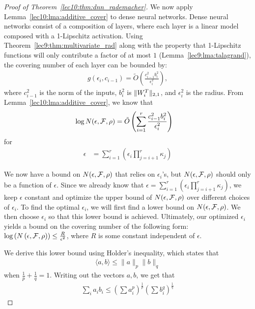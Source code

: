 \begin{proof}[Proof of Theorem~\ref{lec10:thm:dnn_rademacher}]
We now apply Lemma~\ref{lec10:lma:additive_cover} to dense neural networks. Dense neural networks consist of a composition of layers, where each layer is a linear model composed with a 1-Lipschitz activation. Using Theorem~\ref{lec9:thm:multivariate_rad} along with the property that 1-Lipschitz functions will only contribute a factor of at most $1$ (Lemma~\ref{lec9:lma:talagrand}), the covering number of each layer can be bounded by:
\begin{align}
    g\left(\epsilon_i, c_{i-1}\right) = \tilde{O}\left(\frac{c_{i-1}^2b_i^2}{\epsilon_i^2}\right),
\end{align}
where $c_{i-1}^2$ is the norm of the inputs, $b_i^2$ is $\|W_i^T\|_{2,1}$, and $\epsilon_i^2$ is the radius. From Lemma~\ref{lec10:lma:additive_cover}, we know that 
\begin{align}
    \log N(\epsilon, \mathcal F, \rho) &= \tilde{O}\left(\sum_{i=1}^{r}\frac{c_{i-1}^2b_i^2}{\epsilon_i^2}\right) 
\end{align}
for
\begin{align}
    \epsilon &= \sum_{i=1}^{r} \left(\epsilon_i \prod_{j=i+1}^{r}\kappa_j\right)
\end{align}

We now have a bound on $N(\epsilon, \mathcal F, \rho)$ that relies on $\epsilon_i$'s, but $N(\epsilon, \mathcal F, \rho)$ should only be a function of $\epsilon$. Since we already know that $\epsilon = \sum_{i=1}^{r} \left(\epsilon_i \prod_{j=i+1}^{r}\kappa_j\right)$, we keep $\epsilon$ constant and optimize the upper bound of $N(\epsilon, \mathcal F, \rho)$ over different choices of $\epsilon_i$. To find the optimal $\epsilon_i$, we will first find a lower bound on $N(\epsilon, \mathcal F, \rho)$. We then choose $\epsilon_i$ so that this lower bound is achieved. Ultimately, our optimized $\epsilon_i$ yields a bound on the covering number of the following form: $\log\left(N\left(\epsilon, \mathcal F, \rho\right)\right) \leq \frac{R}{\epsilon^2}$, where $R$ is some constant independent of $\epsilon$. 

We derive this lower bound using Holder's inequality, which states that
\begin{align}
    \langle a,  b \rangle \leq \|a\|_p \|b\|_q
\end{align}
when $\frac{1}{p} + \frac{1}{q} = 1$. Writing out the vectors $a, b$, we get that 
\begin{align}
    \sum_{i}a_ib_i \leq \left(\sum a_i^p\right)^{\frac{1}{p}}\left(\sum b_i^q\right)^{\frac{1}{q}}
\end{align}


\end{proof}
